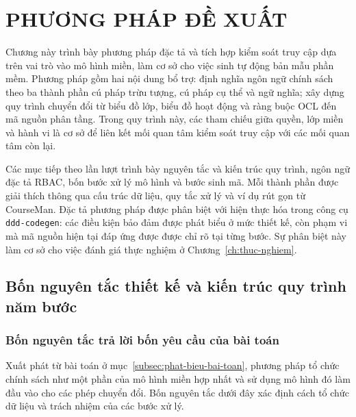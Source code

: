 
\chapter{PHƯƠNG PHÁP ĐỀ XUẤT}
\label{ch:phuong-phap}

\begingroup
\setlength{\emergencystretch}{3em}
\renewcommand{\tabularxcolumn}[1]{>{\raggedright\arraybackslash}p{#1}}
\renewcommand{\topfraction}{0.9}
\renewcommand{\textfraction}{0.08}
\renewcommand{\floatpagefraction}{0.75}
\lstset{float=htbp}

Chương này trình bày phương pháp đặc tả và tích hợp kiểm soát truy cập dựa trên vai trò vào mô hình miền, làm cơ sở cho việc sinh tự động bản mẫu phần mềm. Phương pháp gồm hai nội dung bổ trợ: định nghĩa ngôn ngữ chính sách theo ba thành phần cú pháp trừu tượng, cú pháp cụ thể và ngữ nghĩa; xây dựng quy trình chuyển đổi từ biểu đồ lớp, biểu đồ hoạt động và ràng buộc OCL đến mã nguồn phân tầng. Trong quy trình này, các tham chiếu giữa quyền, lớp miền và hành vi là cơ sở để liên kết mối quan tâm kiểm soát truy cập với các mối quan tâm còn lại.

Các mục tiếp theo lần lượt trình bày nguyên tắc và kiến trúc quy trình, ngôn ngữ đặc tả RBAC, bốn bước xử lý mô hình và bước sinh mã. Mỗi thành phần được giải thích thông qua cấu trúc dữ liệu, quy tắc xử lý và ví dụ rút gọn từ CourseMan. Đặc tả phương pháp được phân biệt với hiện thực hóa trong công cụ \texttt{ddd-codegen}: các điều kiện bảo đảm được phát biểu ở mức thiết kế, còn phạm vi mà mã nguồn hiện tại đáp ứng được được chỉ rõ tại từng bước. Sự phân biệt này làm cơ sở cho việc đánh giá thực nghiệm ở Chương~\ref{ch:thuc-nghiem}.

\section{Bốn nguyên tắc thiết kế và kiến trúc quy trình năm bước}
\label{sec:tong-quan-pp}

\subsection{Bốn nguyên tắc trả lời bốn yêu cầu của bài toán}

Xuất phát từ bài toán ở mục~\ref{subsec:phat-bieu-bai-toan}, phương pháp tổ chức chính sách như một phần của mô hình miền hợp nhất và sử dụng mô hình đó làm đầu vào cho các phép chuyển đổi. Bốn nguyên tắc dưới đây xác định cách tổ chức dữ liệu và trách nhiệm của các bước xử lý.

